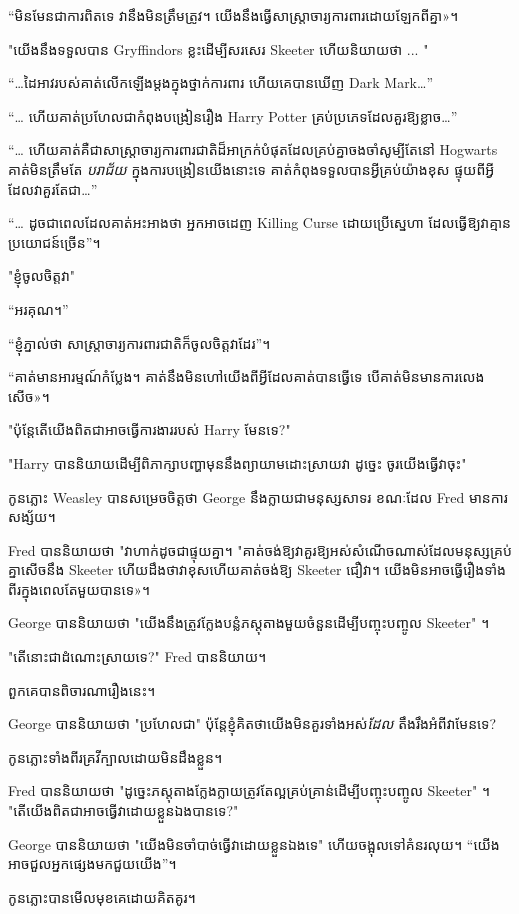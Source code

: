 {{“មិន​មែន​ជា​ការ​ពិត​ទេ វា​នឹង​មិន​ត្រឹម​ត្រូវ។ យើង​នឹង​ធ្វើ​សាស្ត្រាចារ្យ​ការពារ​ដោយ​ឡែក​ពី​គ្នា»។

"យើងនឹងទទួលបាន Gryffindors ខ្លះដើម្បីសរសេរ Skeeter ហើយនិយាយថា ... "

“…ដៃអាវរបស់គាត់លើកឡើងម្តងក្នុងថ្នាក់ការពារ ហើយគេបានឃើញ Dark Mark…”

“… ហើយគាត់ប្រហែលជាកំពុងបង្រៀនរឿង Harry Potter គ្រប់ប្រភេទដែលគួរឱ្យខ្លាច…”

“… ហើយគាត់គឺជាសាស្ត្រាចារ្យការពារជាតិដ៏អាក្រក់បំផុតដែលគ្រប់គ្នាចងចាំសូម្បីតែនៅ Hogwarts គាត់មិនត្រឹមតែ \emph{បរាជ័យ} ក្នុងការបង្រៀនយើងនោះទេ គាត់កំពុងទទួលបានអ្វីគ្រប់យ៉ាងខុស ផ្ទុយពីអ្វីដែលវាគួរតែជា…”

“… ដូចជាពេលដែលគាត់អះអាងថា អ្នកអាចដេញ Killing Curse ដោយប្រើស្នេហា ដែលធ្វើឱ្យវាគ្មានប្រយោជន៍ច្រើន”។

"ខ្ញុំចូលចិត្តវា"

“អរគុណ។”

“ខ្ញុំភ្នាល់ថា សាស្ត្រាចារ្យការពារជាតិក៏ចូលចិត្តវាដែរ”។

“គាត់​មាន​អារម្មណ៍​កំប្លែង។ គាត់​នឹង​មិន​ហៅ​យើង​ពី​អ្វី​ដែល​គាត់​បាន​ធ្វើ​ទេ បើ​គាត់​មិន​មាន​ការ​លេង​សើច»។

"ប៉ុន្តែតើយើងពិតជាអាចធ្វើការងាររបស់ Harry មែនទេ?"

"Harry បាននិយាយដើម្បីពិភាក្សាបញ្ហាមុននឹងព្យាយាមដោះស្រាយវា ដូច្នេះ ចូរយើងធ្វើវាចុះ"

កូនភ្លោះ Weasley បានសម្រេចចិត្តថា George នឹងក្លាយជាមនុស្សសាទរ ខណៈដែល Fred មានការសង្ស័យ។

Fred បាននិយាយថា "វាហាក់ដូចជាផ្ទុយគ្នា។ "គាត់ចង់ឱ្យវាគួរឱ្យអស់សំណើចណាស់ដែលមនុស្សគ្រប់គ្នាសើចនឹង Skeeter ហើយដឹងថាវាខុសហើយគាត់ចង់ឱ្យ Skeeter ជឿវា។ យើង​មិន​អាច​ធ្វើ​រឿង​ទាំង​ពីរ​ក្នុង​ពេល​តែ​មួយ​បាន​ទេ»។

George បាននិយាយថា "យើងនឹងត្រូវក្លែងបន្លំភស្តុតាងមួយចំនួនដើម្បីបញ្ចុះបញ្ចូល Skeeter" ។

"តើនោះជាដំណោះស្រាយទេ?" Fred បាននិយាយ។

ពួកគេបានពិចារណារឿងនេះ។

George បាននិយាយថា "ប្រហែលជា" ប៉ុន្តែខ្ញុំគិតថាយើងមិនគួរទាំងអស់\emph{ដែល} តឹងរឹងអំពីវាមែនទេ?

កូនភ្លោះទាំងពីរគ្រវីក្បាលដោយមិនដឹងខ្លួន។

Fred បាននិយាយថា "ដូច្នេះភស្តុតាងក្លែងក្លាយត្រូវតែល្អគ្រប់គ្រាន់ដើម្បីបញ្ចុះបញ្ចូល Skeeter" ។ "តើយើងពិតជាអាចធ្វើវាដោយខ្លួនឯងបានទេ?"

George បាននិយាយថា "យើងមិនចាំបាច់ធ្វើវាដោយខ្លួនឯងទេ" ហើយចង្អុលទៅគំនរលុយ។ “យើងអាចជួលអ្នកផ្សេងមកជួយយើង”។

កូនភ្លោះបានមើលមុខគេដោយគិតគូរ។

}}
